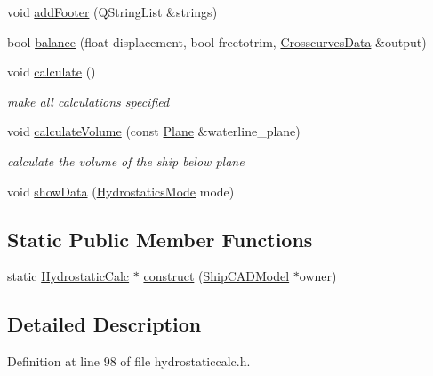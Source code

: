 \begin{DoxyCompactItemize}
\item 
void \hyperlink{classShipCAD_1_1HydrostaticCalc_a52ee7d687ac5c4ad0afa363adaa70a9e}{add\-Footer} (Q\-String\-List \&strings)
\item 
bool \hyperlink{classShipCAD_1_1HydrostaticCalc_a7573a510a6b53e56a79f4042e41ee89e}{balance} (float displacement, bool freetotrim, \hyperlink{structShipCAD_1_1CrosscurvesData}{Crosscurves\-Data} \&output)
\item 
void \hyperlink{classShipCAD_1_1HydrostaticCalc_ab0c8f5dc5c576e6e9eae5fb27fd5bdd0}{calculate} ()
\begin{DoxyCompactList}\small\item\em make all calculations specified \end{DoxyCompactList}\item 
void \hyperlink{classShipCAD_1_1HydrostaticCalc_ad37fd32bf358c96b6653c6c92fd92c20}{calculate\-Volume} (const \hyperlink{classShipCAD_1_1Plane}{Plane} \&waterline\-\_\-plane)
\begin{DoxyCompactList}\small\item\em calculate the volume of the ship below plane \end{DoxyCompactList}\item 
void \hyperlink{classShipCAD_1_1HydrostaticCalc_a3abffc6366d88b203346c324b2281680}{show\-Data} (\hyperlink{namespaceShipCAD_a1d3d04d35d63e8a5e44c63183f79200a}{Hydrostatics\-Mode} mode)
\end{DoxyCompactItemize}
\subsection*{Static Public Member Functions}
\begin{DoxyCompactItemize}
\item 
static \hyperlink{classShipCAD_1_1HydrostaticCalc}{Hydrostatic\-Calc} $\ast$ \hyperlink{classShipCAD_1_1HydrostaticCalc_a527c0f0526a159e3d7cb7ddd4925c295}{construct} (\hyperlink{classShipCAD_1_1ShipCADModel}{Ship\-C\-A\-D\-Model} $\ast$owner)
\end{DoxyCompactItemize}


\subsection{Detailed Description}


Definition at line 98 of file hydrostaticcalc.\-h.



